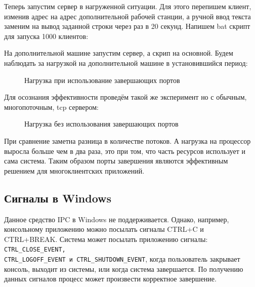 \documentclass[a4paper]{article}
\begin{document}
	Теперь запустим сервер в нагруженной ситуации. Для этого перепишем клиент, изменив адрес на адрес дополнительной рабочей станции, а ручной ввод текста заменим на вывод заданной строки через раз в 20 секунд. Напишем bat скрипт для запуска 1000 клиентов:
	
	
	На дополнительной машине запустим сервер, а скрип на основной. Будем наблюдать за нагрузкой на дополнительной машине в установившийся период:
	\begin{figure}[h!]
		\caption{Нагрузка при использование завершающих портов}
		\label{img:stress_completion}
	\end{figure}
	
	Для осознания эффективности проведём такой же эксперимент но с обычным, многопоточным, tcp сервером:
	\begin{figure}[h!]
		\caption{Нагрузка без использования завершающих портов}
		\label{img:stress_threads}
	\end{figure}
	
	При сравнение заметна разница в количестве потоков. А нагрузка на процессор выросла больше чем в два раза, это при том, что часть ресурсов использует и сама система. Таким образом порты завершения являются эффективным решением для многоклиентских приложений.
\subsection{Сигналы в Windows}
	Данное средство IPC в Windows не поддерживается. Однако, например, консольному приложению можно посылать сигналы CTRL+C и CTRL+BREAK. Система может посылать приложению сигналы: \texttt{CTRL\_CLOSE\_EVENT,\\ CTRL\_LOGOFF\_EVENT и CTRL\_SHUTDOWN\_EVENT}, когда пользователь закрывает консоль, выходит из системы, или когда система завершается. По получению данных сигналов процесс может произвести корректное завершение.
	
\end{document}
